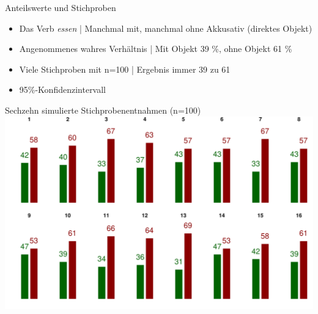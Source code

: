 \begin{frame}
  {Anteilswerte und Stichproben}
  \begin{itemize}[<+->]
    \item Das Verb \textit{essen} | Manchmal mit, manchmal ohne Akkusativ (direktes Objekt)
    \item Angenommenes wahres Verhältnis | \alert{Mit Objekt 39 \%, ohne Objekt 61 \%}
      \Halbzeile
    \item Viele Stichproben mit n=100 | Ergebnis  immer 39 zu 61
     \Doppelzeile 
    \item \alert{95\%-Konfidenzintervall} \\
  \end{itemize}
\end{frame}


\begin{frame}
  {Sechzehn simulierte Stichprobenentnahmen (n=100)}
  \centering 
  \includegraphics[height=0.8\textheight]{RVorlesung/sixteenbernoullis}
\end{frame}

